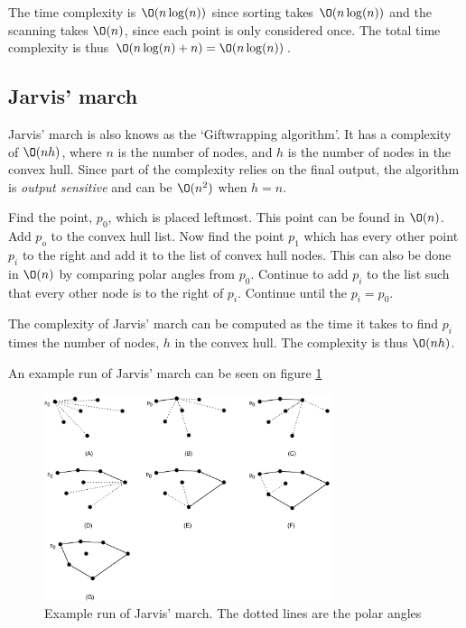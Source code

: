\documentclass[10pt]{article}
\begin{document}
The time complexity is $\O(n\log(n))$ since sorting takes $\O(n\log(n))$ and the scanning takes $\O(n)$, since each point is only considered once. The total time complexity is thus $\O(n\log(n)+n)=\O(n\log(n))$.


\subsection{Jarvis' march} %
\label{sub:jarvis_march}
Jarvis' march is also knows as the `Giftwrapping algorithm'. It has a complexity of $\O(nh)$, where $n$ is the number of nodes, and $h$ is the number of nodes in the convex hull. Since part of the complexity relies on the final output, the algorithm is \emph{output sensitive} and can be $\O(n^2)$ when $h=n$.

Find the point, $p_0$, which is placed leftmost. This point can be found in $\O(n)$. Add $p_o$ to the convex hull list. Now find the point $p_1$ which has every other point $p_i$ to the right and add it to the list of convex hull nodes. This can also be done in $\O(n)$ by comparing polar angles from $p_0$. Continue to add $p_i$ to the list such that every other node is to the right of $p_i$. Continue until the $p_i=p_0$.

The complexity of Jarvis' march can be computed as the time it takes to find $p_i$ times the number of nodes, $h$ in the convex hull. The complexity is thus $\O(nh)$.

An example run of Jarvis' march can be seen on figure \ref{fig17}

\begin{figure}[ht]
\centering
\includegraphics[width=0.75\textwidth]{figures/fig17.pdf}
\caption{Example run of Jarvis' march. The dotted lines are the polar angles}
\label{fig17}
\end{figure}
\end{document}
